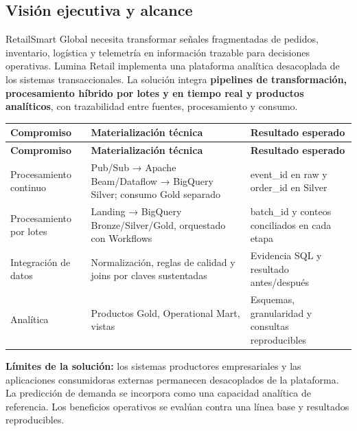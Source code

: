 \documentclass[11pt]{article}
\begin{document}
\subsection{Visión ejecutiva y alcance}

RetailSmart Global necesita transformar señales fragmentadas de pedidos, inventario, logística y telemetría en información trazable para decisiones operativas. Lumina Retail implementa una plataforma analítica desacoplada de los sistemas transaccionales. La solución integra \textbf{pipelines de transformación, procesamiento híbrido por lotes y en tiempo real y productos analíticos}, con trazabilidad entre fuentes, procesamiento y consumo.\par

\begingroup\small
\begin{longtable}{@{}>{\raggedright\arraybackslash}p{}>{\raggedright\arraybackslash}p{}>{\raggedright\arraybackslash}p{}@{}}
\toprule
\textbf{Compromiso} & \textbf{Materialización técnica} & \textbf{Resultado esperado} \\
\midrule
\endfirsthead
\toprule
\textbf{Compromiso} & \textbf{Materialización técnica} & \textbf{Resultado esperado} \\
\midrule
\endhead
Procesamiento continuo & Pub/\allowbreak{}Sub → Apache Beam/\allowbreak{}Dataflow → BigQuery Silver; consumo Gold separado & event\_\allowbreak{}id en raw y order\_\allowbreak{}id en Silver \\
Procesamiento por lotes & Landing → BigQuery Bronze/\allowbreak{}Silver/\allowbreak{}Gold, orquestado con Workflows & batch\_\allowbreak{}id y conteos conciliados en cada etapa \\
Integración de datos & Normalización, reglas de calidad y joins por claves sustentadas & Evidencia SQL y resultado antes/\allowbreak{}después \\
Analítica & Productos Gold, Operational Mart, vistas & Esquemas, granularidad y consultas reproducibles \\
\bottomrule
\end{longtable}
\endgroup

\textbf{Límites de la solución:} los sistemas productores empresariales y las aplicaciones consumidoras externas permanecen desacoplados de la plataforma. La predicción de demanda se incorpora como una capacidad analítica de referencia. Los beneficios operativos se evalúan contra una línea base y resultados reproducibles.\par
\end{document}
